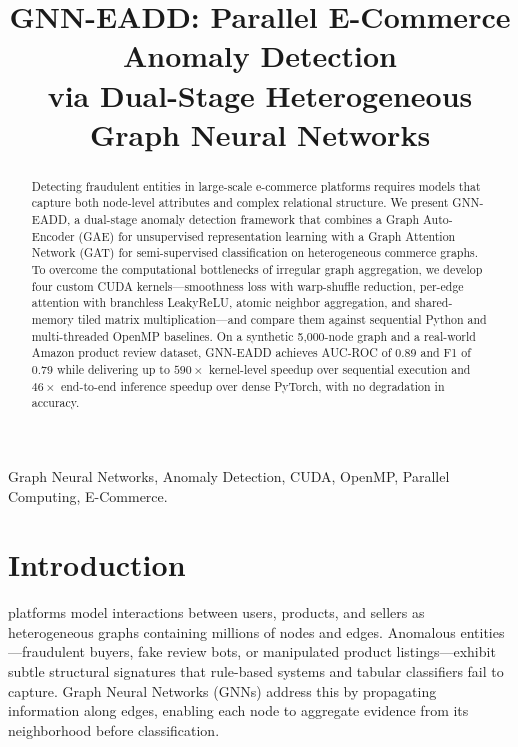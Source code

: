 \documentclass[conference]{IEEEtran}
\begin{document}
\title{GNN-EADD: Parallel E-Commerce Anomaly Detection\\via Dual-Stage Heterogeneous Graph Neural Networks}

\author{
}

\maketitle

\begin{abstract}
Detecting fraudulent entities in large-scale e-commerce platforms requires models that capture both node-level attributes and complex relational structure. We present GNN-EADD, a dual-stage anomaly detection framework that combines a Graph Auto-Encoder (GAE) for unsupervised representation learning with a Graph Attention Network (GAT) for semi-supervised classification on heterogeneous commerce graphs. To overcome the computational bottlenecks of irregular graph aggregation, we develop four custom CUDA kernels---smoothness loss with warp-shuffle reduction, per-edge attention with branchless LeakyReLU, atomic neighbor aggregation, and shared-memory tiled matrix multiplication---and compare them against sequential Python and multi-threaded OpenMP baselines. On a synthetic 5{,}000-node graph and a real-world Amazon product review dataset, GNN-EADD achieves AUC-ROC of 0.89 and F1 of 0.79 while delivering up to $590\times$ kernel-level speedup over sequential execution and $46\times$ end-to-end inference speedup over dense PyTorch, with no degradation in accuracy.
\end{abstract}

\begin{IEEEkeywords}
Graph Neural Networks, Anomaly Detection, CUDA, OpenMP, Parallel Computing, E-Commerce.
\end{IEEEkeywords}

\section{Introduction}
 platforms model interactions between users, products, and sellers as heterogeneous graphs containing millions of nodes and edges. Anomalous entities---fraudulent buyers, fake review bots, or manipulated product listings---exhibit subtle structural signatures that rule-based systems and tabular classifiers fail to capture. Graph Neural Networks (GNNs) address this by propagating information along edges, enabling each node to aggregate evidence from its neighborhood before classification.
\end{document}
